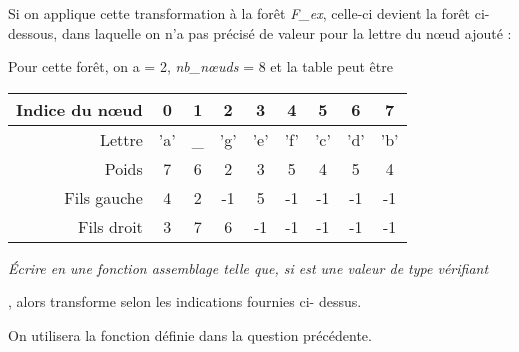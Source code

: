 Si on applique cette transformation à la forêt {\it F\_ex}, celle-ci devient la forêt ci-dessous, dans laquelle on
n’a pas précisé de valeur pour la lettre du nœud ajouté :
\begin{center}
\end{center}
Pour cette forêt, on a  = 2, {\it nb\_nœuds} = 8 et la table peut être
  \begin{center}
    \begin{tabular}{r|cccccccc}
     Indice du nœud  & 0&1&2&3&4&5&6&7\\
     \hline
     Lettre  & 'a'&\_&'g'&'e'&'f'&'c'&'d'&'b'\\
     Poids & 7&6&2&3&5&4&5&4\\
     Fils gauche &4&2&-1&5&-1&-1&-1&-1\\
     Fils droit &3&7&6&-1&-1&-1&-1&-1\\
    \end{tabular}
  \end{center}
\begin{Exercise}\it
Écrire en une fonction assemblage telle que, si  est une valeur de type 
vérifiant 

, alors  transforme  selon les indications fournies ci- dessus. 

On utilisera la fonction  définie dans la question précédente.
\end{Exercise}
